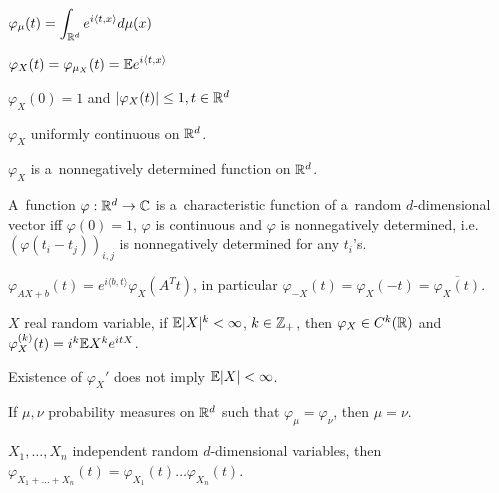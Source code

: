 



	\begin{definition}
		$\displaystyle\varphi_\mu(t) = \int_{\mathbb{R}^d} e^{i\langle t,x\rangle}d\mu(x)$
		
		$\displaystyle\varphi_X(t) = \varphi_{\mu_X}(t) = \mathbb{E} e^{i\langle t,x\rangle}$
	\end{definition}
	
	\begin{proposition}
		$\varphi_X(0) = 1$ and $|\varphi_X(t)| \leq 1, t \in \mathbb{R}^d$
	\end{proposition}
	
	\begin{proposition}
		$\varphi_X$ uniformly continuous on $\mathbb{R}^d$.
	\end{proposition}
	
	\begin{proposition}
		$\varphi_X$ is a~nonnegatively determined function on $\mathbb{R}^d$.
	\end{proposition}
	
	\begin{theorem}[Bochner]
		A~function $\varphi:\mathbb{R}^d \to {\mathbb{C}}$ is a~characteristic function of a~random $d$-dimensional vector iff $\varphi(0)=1$, $\varphi$ is continuous and $\varphi$ is nonnegatively determined, i.e. $(\varphi(t_i - t_j))_{i,j}$ is nonnegatively determined for any $t_i$'s.
	\end{theorem}
	
	\begin{proposition}
		$\varphi_{AX+b}(t) = e^{i \langle b,t\rangle} \varphi_X(A^T t)$, in particular $\varphi_{-X}(t) = \varphi_X(-t) = \overline{\varphi_X(t)}$.
	\end{proposition}
	
	\begin{proposition}
		$X$ real random variable, if $\mathbb{E} |X|^k < \infty$, $k \in {\mathbb{Z}}_+$, then $\varphi_X \in C^k(\mathbb{R})$ and $\varphi_X^{(k)}(t) = i^k \mathbb{E} X^k e^{itX}$.
	\end{proposition}
	
	\begin{remark}
		Existence of $\varphi_X'$ does not imply $\mathbb{E} |X| < \infty$.
	\end{remark}
	
	\begin{proposition}
		If $\mu, \nu$ probability measures on $\mathbb{R}^d$ such that $\varphi_\mu = \varphi_\nu$, then $\mu = \nu$.
	\end{proposition}
	
	\begin{proposition}
		$X_1, \ldots, X_n$ independent random $d$-dimensional variables, then\\ $\varphi_{X_1 + \ldots + X_n} (t) = \varphi_{X_1}(t) \ldots \varphi_{X_n}(t)$.
	\end{proposition}









 
 
